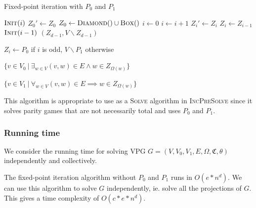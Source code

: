 \begin{algorithm}
	\caption{Fixed-point iteration with $P_0$ and $P_1$}
	\label{alg_FPITE}
	\begin{multicols}{2}
		\begin{algorithmic}[1]
					\State $\textsc{Init}(i)$
				\EndFor
				\Repeat
					\State $Z_0'\gets Z_0$
					\State $Z_0 \gets \textsc{Diamond}() \cup \textsc{Box}()$
					\State $i \gets 0$
						\State $i \gets i+1$
						\State $Z_i' \gets Z_i$
						\State $Z_i \gets Z_{i-1}$
						\State $\textsc{Init}(i-1)$
					\EndWhile
				\State \Return $(Z_{d-1},V\backslash Z_{d-1})$
			\EndFunction
		\end{algorithmic}\bigskip\bigskip
		\begin{algorithmic}[1]
			\Function{Init}{$i$}
				\State $Z_i \gets P_0$ if $i$ is odd, $V\backslash P_1$ otherwise
			\EndFunction
		\end{algorithmic}\bigskip
		\begin{algorithmic}[1]
			\Function{Diamond}{}
				\State \Return $\{ v \in V_0\ |\ \exists_{w\in V} (v,w) \in E \wedge w \in Z_{\Omega(w)}\}$
			\EndFunction
		\end{algorithmic}\bigskip
		\begin{algorithmic}[1]
			\Function{Box}{}
			\State \Return $\{ v \in V_1\ |\ \forall_{w\in V} (v,w) \in E \implies w \in Z_{\Omega(w)}\}$
			\EndFunction
		\end{algorithmic}
	\end{multicols}
\end{algorithm}

This algorithm is appropriate to use as a \textsc{Solve} algorithm in \textsc{IncPreSolve} since it solves parity games that are not necessarily total and uses $P_0$ and $P_1$.

\subsubsection{Running time}
We consider the running time for solving VPG $G = (V,V_0,V_1,E,\Omega,\mathfrak{C},\theta)$ independently and collectively.

The fixed-point iteration algorithm without $P_0$ and $P_1$ runs in $O(e*n^d)$. We can use this algorithm to solve $G$ independently, ie. solve all the projections of $G$. This gives a time complexity of $O(c*e*n^d)$.

